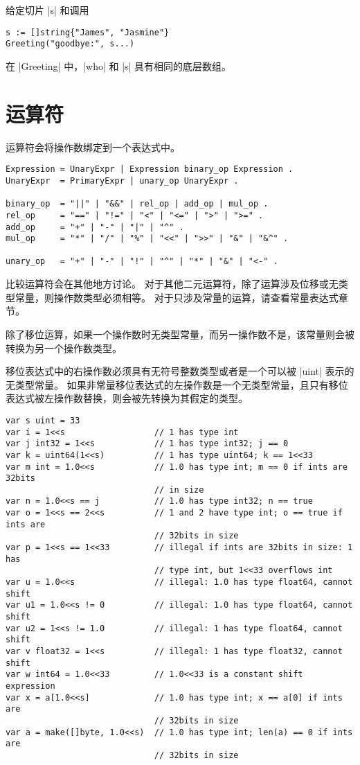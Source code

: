 给定切片 \code|s| 和调用
\begin{lstlisting}[style=golang]
s := []string{"James", "Jasmine"}
Greeting("goodbye:", s...)
\end{lstlisting}
在 \code|Greeting| 中，\code|who| 和 \code|s| 具有相同的底层数组。

\section{运算符}
运算符会将操作数绑定到一个表达式中。
\begin{lstlisting}[style=EBNF]
Expression = UnaryExpr | Expression binary_op Expression .
UnaryExpr  = PrimaryExpr | unary_op UnaryExpr .

binary_op  = "||" | "&&" | rel_op | add_op | mul_op .
rel_op     = "==" | "!=" | "<" | "<=" | ">" | ">=" .
add_op     = "+" | "-" | "|" | "^" .
mul_op     = "*" | "/" | "%" | "<<" | ">>" | "&" | "&^" .

unary_op   = "+" | "-" | "!" | "^" | "*" | "&" | "<-" .
\end{lstlisting}
比较运算符会在其他地方讨论。
对于其他二元运算符，除了运算涉及位移或无类型常量，则操作数类型必须相等。
对于只涉及常量的运算，请查看常量表达式章节。

除了移位运算，如果一个操作数时无类型常量，而另一操作数不是，该常量则会被转换为另一个操作数类型。

移位表达式中的右操作数必须具有无符号整数类型或者是一个可以被 \code|uint| 表示的无类型常量。
如果非常量移位表达式的左操作数是一个无类型常量，且只有移位表达式被左操作数替换，则会被先转换为其假定的类型。
\begin{lstlisting}[style=golang]
var s uint = 33
var i = 1<<s                  // 1 has type int
var j int32 = 1<<s            // 1 has type int32; j == 0
var k = uint64(1<<s)          // 1 has type uint64; k == 1<<33
var m int = 1.0<<s            // 1.0 has type int; m == 0 if ints are 32bits 
							  // in size
var n = 1.0<<s == j           // 1.0 has type int32; n == true
var o = 1<<s == 2<<s          // 1 and 2 have type int; o == true if ints are 
							  // 32bits in size
var p = 1<<s == 1<<33         // illegal if ints are 32bits in size: 1 has 
							  // type int, but 1<<33 overflows int
var u = 1.0<<s                // illegal: 1.0 has type float64, cannot shift
var u1 = 1.0<<s != 0          // illegal: 1.0 has type float64, cannot shift
var u2 = 1<<s != 1.0          // illegal: 1 has type float64, cannot shift
var v float32 = 1<<s          // illegal: 1 has type float32, cannot shift
var w int64 = 1.0<<33         // 1.0<<33 is a constant shift expression
var x = a[1.0<<s]             // 1.0 has type int; x == a[0] if ints are   
							  // 32bits in size
var a = make([]byte, 1.0<<s)  // 1.0 has type int; len(a) == 0 if ints are 
							  // 32bits in size
\end{lstlisting}


